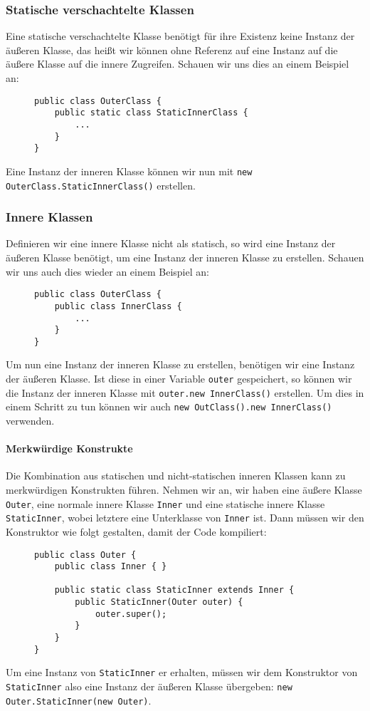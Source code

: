 	\subsubsection{Statische verschachtelte Klassen}
		Eine statische verschachtelte Klasse benötigt für ihre Existenz keine Instanz der äußeren Klasse, das heißt wir können ohne Referenz auf eine Instanz auf die äußere Klasse auf die innere Zugreifen. Schauen wir uns dies an einem Beispiel an:
		\begin{figure}[H]
			\centering
			\begin{lstlisting}
public class OuterClass {
	public static class StaticInnerClass {
		...
	}
}
\end{lstlisting}
		\end{figure}
		Eine Instanz der inneren Klasse können wir nun mit \lstinline|new OuterClass.StaticInnerClass()| erstellen.
	
	\subsubsection{Innere Klassen}
		Definieren wir eine innere Klasse nicht als statisch, so wird eine Instanz der äußeren Klasse benötigt, um eine Instanz der inneren Klasse zu erstellen. Schauen wir uns auch dies wieder an einem Beispiel an:
		\begin{figure}[H]
			\centering
			\begin{lstlisting}
public class OuterClass {
	public class InnerClass {
		...
	}
}
\end{lstlisting}
		\end{figure}
		Um nun eine Instanz der inneren Klasse zu erstellen, benötigen wir eine Instanz der äußeren Klasse. Ist diese in einer Variable \lstinline|outer| gespeichert, so können wir die Instanz der inneren Klasse mit \lstinline|outer.new InnerClass()| erstellen. Um dies in einem Schritt zu tun können wir auch \lstinline|new OutClass().new InnerClass()| verwenden.
		
		\paragraph{Merkwürdige Konstrukte}
			Die Kombination aus statischen und nicht-statischen inneren Klassen kann zu merkwürdigen Konstrukten führen. Nehmen wir an, wir haben eine äußere Klasse \lstinline|Outer|, eine normale innere Klasse \lstinline|Inner| und eine statische innere Klasse \lstinline|StaticInner|, wobei letztere eine Unterklasse von \lstinline|Inner| ist. Dann müssen wir den Konstruktor wie folgt gestalten, damit der Code kompiliert:
			\begin{figure}[H]
				\centering
				\begin{lstlisting}
public class Outer {
	public class Inner { }
	
	public static class StaticInner extends Inner {
		public StaticInner(Outer outer) {
			outer.super();
		}
	}
}
\end{lstlisting}
			\end{figure}
			Um eine Instanz von \lstinline|StaticInner| er erhalten, müssen wir dem Konstruktor von \lstinline|StaticInner| also eine Instanz der äußeren Klasse übergeben: \lstinline|new Outer.StaticInner(new Outer)|.
	

